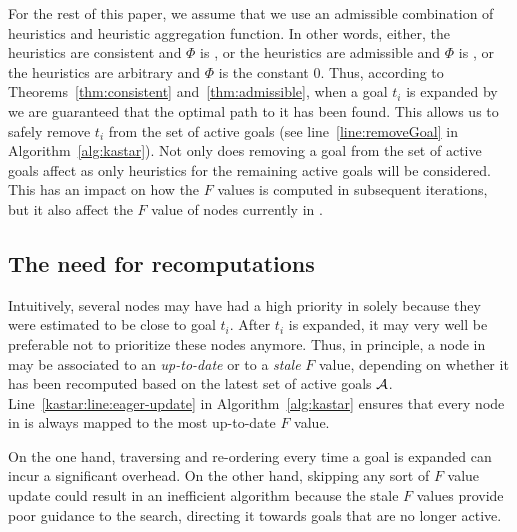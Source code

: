 For the rest of this paper, we assume that we use an admissible combination of heuristics and heuristic aggregation function.
In other words, either, the heuristics are consistent and $\Phi$ is \axiomcons, or the heuristics are admissible and $\Phi$ is \axiomadm, or the heuristics are arbitrary and $\Phi$ is the constant 0.
Thus, according to Theorems~\ref{thm:consistent} and~\ref{thm:admissible}, when a goal $t_i$ is expanded by \kastarphi we are guaranteed that the optimal path to it has been found.
This allows us to safely remove $t_i$ from the set of active goals (see line~\ref{line:removeGoal} in Algorithm~\ref{alg:kastar}).
Not only does removing a goal from the set of active goals affect as only heuristics for the remaining active goals will be considered.
This has an impact on how the $F$ values is computed in subsequent \kastar iterations, but it also affect the $F$ value of nodes currently in \open.

\subsection{The need for recomputations}
Intuitively, several nodes may have had a high priority in \open solely because they were estimated to be close to goal $t_i$.
After $t_i$ is expanded, it may very well be preferable not to prioritize these nodes anymore.
Thus, in principle, a node in \open may be associated to an \emph{up-to-date} or to a \emph{stale} $F$ value, depending on whether it has been recomputed based on the latest set of active goals $\mathcal{A}$. 
Line~\ref{kastar:line:eager-update} in Algorithm~\ref{alg:kastar} ensures that every node in \open is always mapped to the most up-to-date $F$ value.

On the one hand, traversing and re-ordering \open every time a goal is expanded can incur a significant overhead.
On the other hand, skipping any sort of $F$ value update could result in an inefficient algorithm because the stale $F$ values provide poor guidance to the search, directing it towards goals that are no longer active.

